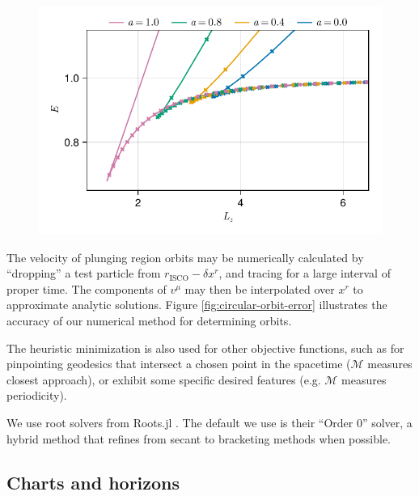 \begin{figure}
    \centering
    \includegraphics[width=0.95\linewidth]{figures/circular-orbits.E-Lz.pdf}
    \caption{}
    \label{fig:e-lz-cusp}
\end{figure}

The velocity of plunging region orbits may be numerically calculated by ``dropping'' a test particle from $r_\text{ISCO} -  \delta x^r$, and tracing for a large interval of proper time. The components of $v^\mu$ may then be interpolated over $x^r$ to approximate analytic solutions. Figure \ref{fig:circular-orbit-error} illustrates the accuracy of our numerical method for determining orbits.

The heuristic minimization is also used for other objective functions, such as for pinpointing geodesics that intersect a chosen point in the spacetime ($\mathscr{M}$ measures closest approach), or exhibit some specific desired features (e.g. $\mathscr{M}$ measures periodicity).

We use root solvers from Roots.jl \citep{}. The default we use is their ``Order 0'' solver, a hybrid method that refines from secant to bracketing methods when possible.



\subsection{Charts and horizons}

